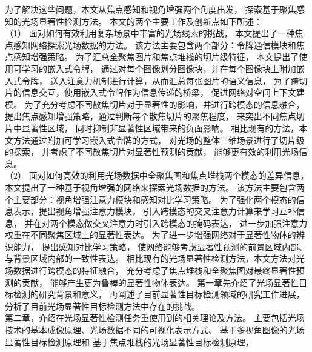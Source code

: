 %
%
为了解决这些问题，本文从焦点感知和视角增强两个角度出发，
探索基于聚焦感知的光场显著性检测方法。
本文的两个主要工作及创新点如下所述：
\\
%
%
%
%
\indent
%
%
（1）
面对如何有效利用复杂场景中丰富的光场线索的挑战，
本文提出了一种焦点感知网络探索光场数据的方法。
%
%
该方法主要包含两个部分：令牌通信模块和焦点感知增强策略。
%
%
为了汇总全聚焦图片和焦点堆栈的切片级特征，
本文提出了使用可学习的嵌入式令牌，
通过对每个图像划分图像块，并在每个图像块上附加嵌入式令牌，
送入注意力机制进行计算，从而汇总每张图片的语义信息，
为了跨切片的信息交互，使用嵌入式令牌作为信息传递的桥梁，
促进网络对空间上下文建模。
%
%
为了充分考虑不同散焦切片对于显著性的影响，并进行跨模态的信息融合，
提出焦点感知增强策略，通过判断每个散焦切片的聚焦程度，
来突出不同焦点切片中显著性区域，
同时抑制非显著性区域带来的负面影响。
%
%
相比现有的方法，本文方法通过附加可学习嵌入式令牌的方式，
对光场的整体三维场景进行了切片级的探索，
并考虑了不同散焦切片对显著性预测的贡献，
能够更有效的利用光场信息。
\\
%
%
%
%
\indent
%
%
（2）
面对如何高效的利用光场数据中全聚焦图和焦点堆栈两个模态的差异信息，
本文提出了一种基于视角增强的网络来探索光场数据的方法。
%
%
该方法主要包含两个主要部分：视角增强注意力模块和感知对比学习策略。
%
%
为了强化两个模态的信息表示，提出视角增强注意力模块，
引入跨模态的交叉注意力计算来学习互补信息，
并在对两个模态做交叉注意力时引入跨模态的掩码表达，
进一步加强注意力权重在不同聚焦区域上的显著性表达。
%
%
为了进一步增强网络对于显著性物体的辨识能力，
提出感知对比学习策略，
使网络能够考虑显著性预测的前景区域内部、与背景区域内部的一致性表达。
%
%
相比现有的光场显著性检测方法，本文方法对光场数据进行跨模态的特征融合，
充分考虑了焦点堆栈和全聚焦图对最终显著性预测的贡献，
能够产生更为鲁棒的显著性物体表达。
第一章先介绍了光场显著性目标检测的研究背景和意义，
再阐述了目前显著性目标检测领域的研究工作进展，
分析了目前光场显著性目标检测方法中存在的挑战。
\\
%
%
%
%
\indent
第二章，介绍在光场显著性检测任务重使用到的相关理论及方法。
主要包括光场技术的基本成像原理、光场数据不同的可视化表示方式、
基于多视角图像的光场显著性目标检测原理和
基于焦点堆栈的光场显著性目标检测原理，
